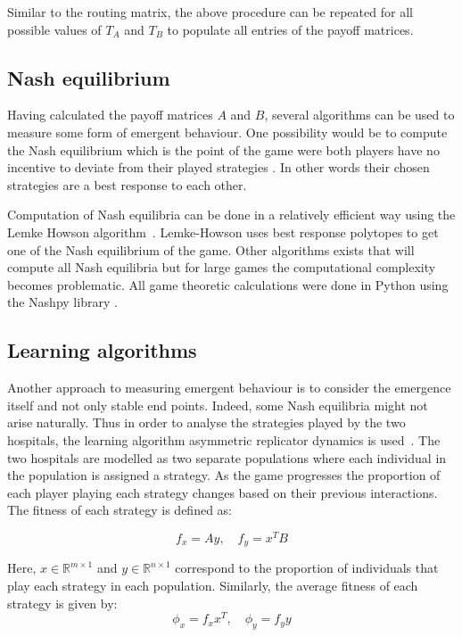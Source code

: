 Similar to the routing matrix, the above procedure can be repeated for all 
possible values of \(T_A\) and \(T_B\) to populate all entries of the payoff 
matrices. 

\subsection{Nash equilibrium}\label{sec:methodology_nash_equilibrium}

Having calculated the payoff matrices \(A\) and \(B\), several algorithms can 
be used to measure some form of emergent behaviour.
One possibility would be to compute the Nash equilibrium
which is the point of the game were both players have no 
incentive to deviate from their played strategies \cite{kreps1989nash}.
In other words their chosen strategies are a best response to each other.

Computation of Nash equilibria can be done in a relatively efficient way using 
the Lemke Howson algorithm~\cite{LemkeHowson}.
Lemke-Howson uses best response polytopes to get one of the Nash equilibrium of
the game. 
Other algorithms exists that will compute all Nash equilibria but 
for large games the computational complexity becomes problematic.
All game theoretic calculations were done in Python using the Nashpy library 
\cite{thenashpyproject}.

\subsection{Learning algorithms}\label{sec:methodology_learning_algorithms}

Another approach to measuring emergent behaviour is to consider 
the emergence itself and not only stable end points. 
Indeed, some Nash equilibria might not arise naturally. 
Thus in order to analyse the strategies played by the two hospitals, the 
learning 
algorithm asymmetric replicator dynamics is 
used~\cite{asymmetricreplicatordynamics}.
The two hospitals are modelled as two separate populations where each 
individual in the population is assigned a strategy.
As the game progresses the proportion of each player playing each strategy 
changes based on their previous interactions.
The fitness of each strategy is defined as:

\begin{equation}\label{eq:asymmetric_fitness}
    f_x = Ay, \quad f_y = x^T B
\end{equation}

Here, \(x \in \mathbb{R}^{m \times 1} \) and
\(y \in \mathbb{R}^{n \times 1}\) correspond to the proportion of individuals 
that play each strategy in each population.
Similarly, the average fitness of each strategy is given by:
\begin{equation}
    \phi_x = f_x x^T, \quad \phi_y = f_y y
\end{equation}

